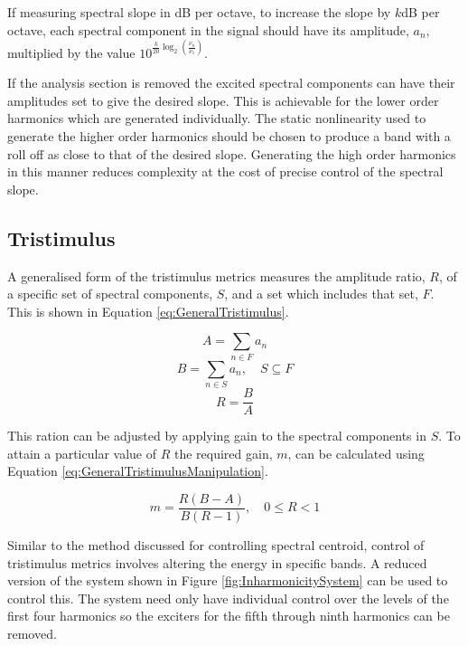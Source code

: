 		If measuring spectral slope in dB per octave, to increase the slope by $k$dB per octave, each spectral
		component in the signal should have its amplitude, $a_{n}$, multiplied by the value
		$10^{\frac{k}{20}\log_{2} \left( \frac{\nu_{n}}{\nu_{1}} \right)}$.

		If the analysis section is removed the excited spectral components can have their amplitudes set to give
		the desired slope. This is achievable for the lower order harmonics which are generated individually.  The
		static nonlinearity used to generate the higher order harmonics should be chosen to produce a band with a
		roll off as close to that of the desired slope. Generating the high order harmonics in this manner reduces
		complexity at the cost of precise control of the spectral slope.

	\subsection{Tristimulus}
	\label{sec:FeatureControl-Parameterisation-Tristimulus}
		A generalised form of the tristimulus metrics measures the amplitude ratio, $R$, of a specific set of
		spectral components, $S$, and a set which includes that set, $F$. This is shown in Equation
		\ref{eq:GeneralTristimulus}.

		\[ A = \sum_{n \in F} a_{n} \]
		\[ B = \sum_{n \in S} a_{n}, \quad S \subseteq F \]
		\begin{equation}
			R = \frac{B}{A}
			\label{eq:GeneralTristimulus}
		\end{equation}

		This ration can be adjusted by applying gain to the spectral components in $S$. To attain a particular
		value of $R$ the required gain, $m$, can be calculated using Equation
		\ref{eq:GeneralTristimulusManipulation}.

		\begin{equation}
			m = \frac{R(B - A)}{B(R - 1)}, \quad 0 \leq R < 1
			\label{eq:GeneralTristimulusManipulation}
		\end{equation}

		Similar to the method discussed for controlling spectral centroid, control of tristimulus metrics involves
		altering the energy in specific bands. A reduced version of the system shown in Figure
		\ref{fig:InharmonicitySystem} can be used to control this. The system need only have individual control
		over the levels of the first four harmonics so the exciters for the fifth through ninth harmonics can be
		removed.

